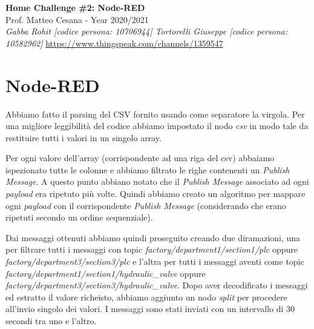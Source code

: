 \documentclass{article}
\begin{document}
\begin{titlepage}
   \begin{center}
      \Huge\textbf{Home Challenge \#2: Node-RED}\\
      \vspace{5mm} %
      \Large Prof. Matteo Cesana - Year 2020/2021\\
      \vspace{5mm} %
      \large\textit{Gabba Rohit [codice persona: 10706944]}
      \linebreak
      \large\textit{Tortorelli Giuseppe [codice persona: 10582962]}
      \linebreak
      \linebreak
      \linebreak
      \href{https://www.thingspeak.com/channels/1359547}{https://www.thingspeak.com/channels/1359547}
      \linebreak
   \end{center}
\end{titlepage}

\pagebreak
\section{Node-RED}
Abbiamo fatto il parsing del CSV fornito usando come separatore la virgola. Per una migliore leggibilità del codice abbiamo impostato il nodo \textit{csv}
in modo tale da restituire tutti i valori in un singolo array. \hfill \break 

Per ogni valore dell'array (corrispondente ad una riga del csv) abbaiamo ispezionato tutte le colonne e abbiamo filtrato le righe contenenti un 
\textit{Publish Message}. \hfill \break
A questo punto abbiano notato che il \textit{Publish Message} associato ad ogni \textit{payload} era ripetuto più volte. Quindi abbiamo creato un algoritmo 
per mappare ogni \textit{payload} con il corrispondente \textit{Publish Message} (considerando che erano ripetuti secondo un ordine sequenziale). \hfill \break 

Dai messaggi ottenuti abbiamo quindi proseguito creando due diramazioni, una per filtrare tutti i messaggi con topic \textit{factory/department1/section1/plc} oppure 
\textit{factory/department3/section3/plc} e l'altra per tutti i messaggi aventi come topic \textit{factory/department1/section1/hydraulic\_valve} oppure 
\textit{factory/department3/section3/hydraulic\_valve}. \hfill \break 
Dopo aver decodificato i messaggi ed estratto il valore richeisto, abbiamo aggiunto un nodo \textit{split} per procedere all'invio singolo dei valori.
\hfill \break I messaggi sono stati inviati con un intervallo di 30 secondi tra uno e l'altro.
\end{document}
